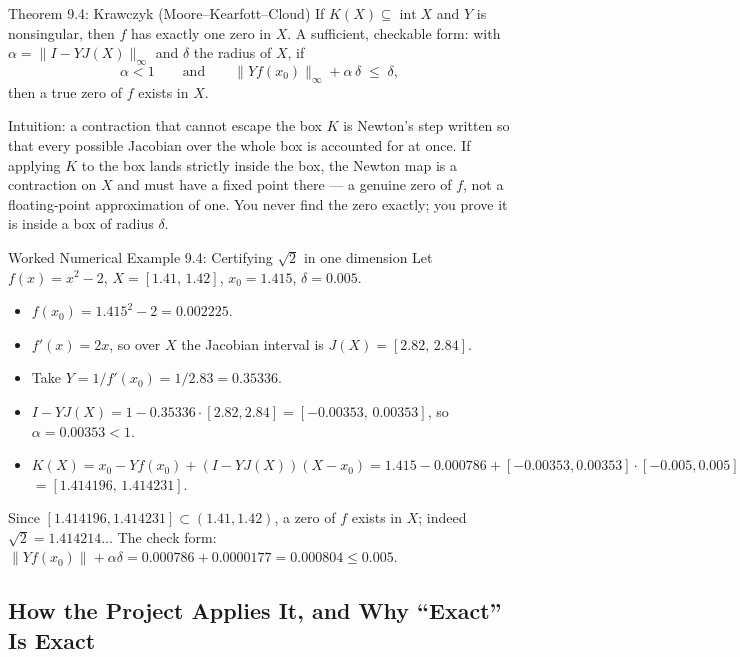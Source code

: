 \documentclass[11pt]{article}
\begin{document}
\begin{thmbox}{Theorem 9.4: Krawczyk (Moore--Kearfott--Cloud)}
If $K(X)\subseteq\operatorname{int}X$ and $Y$ is nonsingular, then $f$ has exactly one zero in $X$. A sufficient, checkable form: with $\alpha=\|I-YJ(X)\|_\infty$ and $\delta$ the radius of $X$, if
\begin{equation}
  \alpha<1\qquad\text{and}\qquad \|Y f(x_0)\|_\infty+\alpha\,\delta\;\le\;\delta,
\end{equation}
then a true zero of $f$ exists in $X$.
\end{thmbox}

\begin{intubox}{Intuition: a contraction that cannot escape the box}
$K$ is Newton's step written so that every possible Jacobian over the whole box is accounted for at once. If applying $K$ to the box lands strictly inside the box, the Newton map is a contraction on $X$ and must have a fixed point there --- a genuine zero of $f$, not a floating-point approximation of one. You never find the zero exactly; you prove it is inside a box of radius $\delta$.
\end{intubox}

\begin{callbox}{Worked Numerical Example 9.4: Certifying $\sqrt2$ in one dimension}
Let $f(x)=x^2-2$, $X=[1.41,\,1.42]$, $x_0=1.415$, $\delta=0.005$.
\begin{itemize}[leftmargin=*,nosep]
  \item $f(x_0)=1.415^2-2=0.002225$.
  \item $f'(x)=2x$, so over $X$ the Jacobian interval is $J(X)=[2.82,\,2.84]$.
  \item Take $Y=1/f'(x_0)=1/2.83=0.35336$.
  \item $I-YJ(X)=1-0.35336\cdot[2.82,2.84]=[-0.00353,\,0.00353]$, so $\alpha=0.00353<1$.
  \item $K(X)=x_0-Yf(x_0)+(I-YJ(X))(X-x_0)=1.415-0.000786+[-0.00353,0.00353]\cdot[-0.005,0.005]$ \\ $=[1.414196,\,1.414231]$.
\end{itemize}
Since $[1.414196,1.414231]\subset(1.41,1.42)$, a zero of $f$ exists in $X$; indeed $\sqrt2=1.414214\ldots$ The check form: $\|Yf(x_0)\|+\alpha\delta=0.000786+0.0000177=0.000804\le0.005$.
\end{callbox}

\subsection{How the Project Applies It, and Why ``Exact'' Is Exact}
\end{document}
